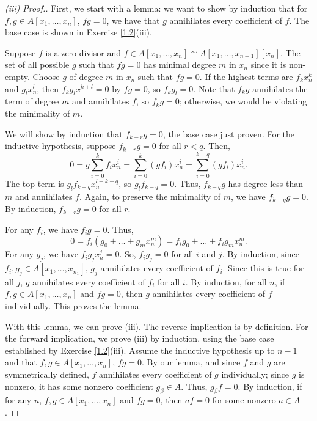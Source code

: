 \begin{proof}[(iii) Proof.]
First, we start with a lemma: we want to show by induction that for $f,g \in A[x_1,\ldots,x_n]$, $fg = 0$, we have that $g$ annihilates every 
coefficient of $f$. The base case is shown in Exercise \ref{1.2}(iii).

Suppose $f$ is a zero-divisor and $f \in A[x_1,\ldots,x_n] \cong A[x_1,\ldots,x_{n-1}][x_n]$. The set of all possible $g$ such that $fg = 0$ has minimal 
degree $m$ in $x_n$ since it is non-empty. Choose $g$ of degree $m$ in $x_n$ such that $fg = 0$. If the highest terms are $f_k x_n^k$ and $g_l x_n^l$, 
then $f_k g_l x^{k+l} = 0$ by $fg = 0$, so $f_k g_l = 0$. Note that $f_k g$ annihilates the term of degree $m$ and annihilates $f$, so $f_k g = 0$; 
otherwise, we would be violating the minimality of $m$.

We will show by induction that $f_{k-r}g = 0$, the base case just proven. For the inductive hypothesis, suppose $f_{k-r}g=0$ for all $r < q$. Then,
$$0 = g\sum_{i=0}^k f_i x_n^i = \sum_{i=0}^k (gf_i)x_n^i = \sum_{i=0}^{k-q} (gf_i)x_n^i.$$
The top term is $g_l f_{k-q} x_n^{l+k-q}$, so $g_l f_{k-q} = 0$. Thus, $f_{k-q} g$ has degree less than $m$ and annihilates $f$. 
Again, to preserve the minimality of $m$, we have $f_{k-q} g = 0$. By induction, $f_{k-r}g = 0$ for all $r$.

For any $f_i$, we have $f_ig = 0$. Thus,
$$0 = f_i\left(g_0 + \dots + g_m x_n^m\right) = f_i g_0 + \dots + f_i g_m x_n^m.$$ 
For any $g_j$, we have $f_i g_j x_n^j = 0$. So, $f_i g_j = 0$ for all $i$ and $j$. By induction,
since $f_i,g_j \in A[x_1,\ldots,x_{n_1}]$, $g_j$ annihilates every coefficient of $f_i$. Since this
is true for all $j$, $g$ annihilates every coefficient of $f_i$ for all $i$. By induction, for all $n$,
if $f,g \in A[x_1,\ldots,x_n]$ and $fg = 0$, then $g$ annihilates every coefficient of $f$ individually. This proves the lemma.

With this lemma, we can prove (iii). The reverse implication is by definition. For the forward implication, we prove (iii) 
by induction, using the base case established by Exercise \ref{1.2}(iii). Assume the inductive hypothesis up to $n-1$ and that $f,g \in A[x_1,\ldots,x_n]$, 
$fg = 0$. By our lemma, and since $f$ and $g$ are symmetrically defined, $f$ annihilates every coefficient of $g$ individually; since $g$ is nonzero,
it has some nonzero coefficient $g_{\beta} \in A$. Thus, $g_{\beta} f = 0$. By induction, if for any $n$, $f,g \in A[x_1,\ldots,x_n]$ and $fg = 0$,
then $af = 0$ for some nonzero $a \in A$.
\end{proof}

